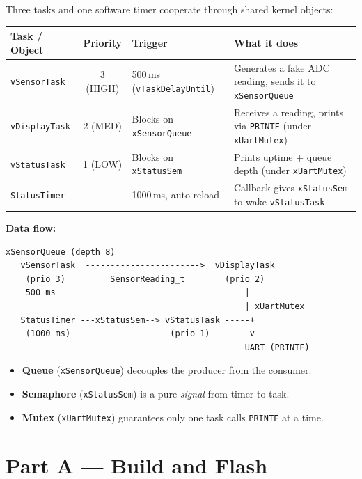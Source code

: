 \documentclass[11pt, a4paper]{article}
\newcommand{\api}[1]{\texttt{\small #1}}
\begin{document}
Three tasks and one software timer cooperate through shared kernel objects:

\renewcommand{\arraystretch}{1.3}
\begin{tabular}{@{} l c p{3.4cm} p{5.4cm} @{}}
  \toprule
  \textbf{Task / Object} & \textbf{Priority} & \textbf{Trigger} & \textbf{What it does} \\
  \midrule
  \texttt{vSensorTask}  & 3 (HIGH) & 500\,ms (\api{vTaskDelayUntil}) &
    Generates a fake ADC reading, sends it to \api{xSensorQueue} \\
  \texttt{vDisplayTask} & 2 (MED)  & Blocks on \api{xSensorQueue} &
    Receives a reading, prints via \api{PRINTF} (under \api{xUartMutex}) \\
  \texttt{vStatusTask}  & 1 (LOW)  & Blocks on \api{xStatusSem} &
    Prints uptime + queue depth (under \api{xUartMutex}) \\
  \texttt{StatusTimer}  & --- & 1000\,ms, auto-reload &
    Callback gives \api{xStatusSem} to wake \texttt{vStatusTask} \\
  \bottomrule
\end{tabular}
\renewcommand{\arraystretch}{1}

\medskip
\textbf{Data flow:}

\begin{lstlisting}[style=textstyle]
                  xSensorQueue (depth 8)
   vSensorTask  ----------------------->  vDisplayTask
    (prio 3)         SensorReading_t        (prio 2)
    500 ms                                      |
                                                | xUartMutex
   StatusTimer ---xStatusSem--> vStatusTask -----+
    (1000 ms)                    (prio 1)        v
                                                UART (PRINTF)
\end{lstlisting}

\begin{itemize}[noitemsep, leftmargin=*]
  \item \textbf{Queue} (\api{xSensorQueue}) decouples the producer from the consumer.
  \item \textbf{Semaphore} (\api{xStatusSem}) is a pure \emph{signal} from timer to task.
  \item \textbf{Mutex} (\api{xUartMutex}) guarantees only one task calls \api{PRINTF}
        at a time.
\end{itemize}

\section{Part A --- Build and Flash}
\end{document}

